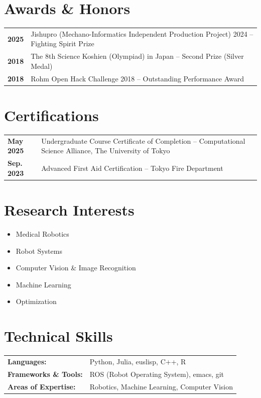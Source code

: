 \documentclass[11pt,a4paper]{article}
\newcommand{\cvitem}[2]{\textbf{#1} & #2 \\[0.3em]}
\begin{document}
\section{Awards \& Honors}
\begin{tabularx}{\textwidth}{@{}p{2.5cm}X@{}}
\cvitem{2025}{Jishupro (Mechano-Informatics Independent Production Project) 2024 -- Fighting Spirit Prize}
\cvitem{2018}{The 8th Science Koshien (Olympiad) in Japan -- Second Prize (Silver Medal)}
\cvitem{2018}{Rohm Open Hack Challenge 2018 -- Outstanding Performance Award}
\end{tabularx}

\section{Certifications}
\begin{tabularx}{\textwidth}{@{}p{2.5cm}X@{}}
\cvitem{May 2025}{Undergraduate Course Certificate of Completion -- Computational Science Alliance, The University of Tokyo}
\cvitem{Sep. 2023}{Advanced First Aid Certification -- Tokyo Fire Department}
\end{tabularx}

\section{Research Interests}
\begin{itemize}[leftmargin=1cm,itemsep=0.2em]
    \item Medical Robotics
    \item Robot Systems
    \item Computer Vision \& Image Recognition
    \item Machine Learning
    \item Optimization
\end{itemize}

\section{Technical Skills}
\begin{tabularx}{\textwidth}{@{}p{4cm}X@{}}
\textbf{Languages:} & Python, Julia, euslisp, C++, R \\[0.3em]
\textbf{Frameworks \& Tools:} & ROS (Robot Operating System), emacs, git\\[0.3em]
\textbf{Areas of Expertise:} & Robotics, Machine Learning, Computer Vision
\end{tabularx}
\end{document}
